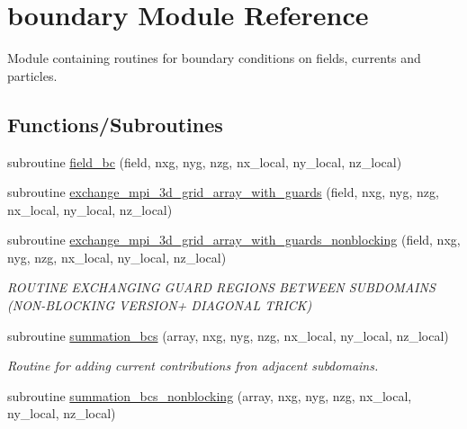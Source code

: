 \hypertarget{namespaceboundary}{}\section{boundary Module Reference}
\label{namespaceboundary}


Module containing routines for boundary conditions on fields, currents and particles.  


\subsection*{Functions/\+Subroutines}
\begin{DoxyCompactItemize}
\item 
subroutine \hyperlink{namespaceboundary_aaf2c39f38c9f0330fd2501f49ef34b7d}{field\+\_\+bc} (field, nxg, nyg, nzg, nx\+\_\+local, ny\+\_\+local, nz\+\_\+local)
\item 
subroutine \hyperlink{namespaceboundary_a7fcd1d8e118d647057f0523af107674e}{exchange\+\_\+mpi\+\_\+3d\+\_\+grid\+\_\+array\+\_\+with\+\_\+guards} (field, nxg, nyg, nzg,                                               nx\+\_\+local, ny\+\_\+local, nz\+\_\+local)
\item 
subroutine \hyperlink{namespaceboundary_a4e895aead34d40e905893ad3a0ee3d32}{exchange\+\_\+mpi\+\_\+3d\+\_\+grid\+\_\+array\+\_\+with\+\_\+guards\+\_\+nonblocking} (field, nxg, nyg, nzg,                                               nx\+\_\+local, ny\+\_\+local, nz\+\_\+local)
\begin{DoxyCompactList}\small\item\em R\+O\+U\+T\+I\+NE E\+X\+C\+H\+A\+N\+G\+I\+NG G\+U\+A\+RD R\+E\+G\+I\+O\+NS B\+E\+T\+W\+E\+EN S\+U\+B\+D\+O\+M\+A\+I\+NS (N\+O\+N-\/\+B\+L\+O\+C\+K\+I\+NG V\+E\+R\+S\+I\+O\+N+ D\+I\+A\+G\+O\+N\+AL T\+R\+I\+CK) \end{DoxyCompactList}\item 
subroutine \hyperlink{namespaceboundary_ad298755064359a32a3e7d89b376329cf}{summation\+\_\+bcs} (array, nxg, nyg, nzg, nx\+\_\+local, ny\+\_\+local, nz\+\_\+local)
\begin{DoxyCompactList}\small\item\em Routine for adding current contributions fron adjacent subdomains. \end{DoxyCompactList}\item 
subroutine \hyperlink{namespaceboundary_a1ad86bf436bc91d3210fdf0f6d86ab1f}{summation\+\_\+bcs\+\_\+nonblocking} (array, nxg, nyg, nzg, nx\+\_\+local, ny\+\_\+local, nz\+\_\+local)

\end{DoxyCompactItemize}
